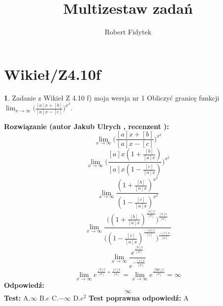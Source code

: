 \documentclass[12pt, a4paper]{article}
\title{Multizestaw zadań}
\author{Robert Fidytek}
\date{}
\theoremstyle{definition} %
\newtheorem{zad}{}
\newcommand{\kategoria}[1]{\section{#1}} %
\newcommand{\zadStart}[1]{\begin{zad}#1\newline} %
\newcommand{\zadStop}{\end{zad}}   %
\newcommand{\rozwStart}[2]{\noindent \textbf{Rozwiązanie (autor #1 , recenzent #2): }\newline} %
\newcommand{\rozwStop}{\newline}                                            %
\newcommand{\odpStart}{\noindent \textbf{Odpowiedź:}\newline}    %
\newcommand{\odpStop}{\newline}                                             %
\newcommand{\testStart}{\noindent \textbf{Test:}\newline} %
\newcommand{\testStop}{\newline} %
\newcommand{\kluczStart}{\noindent \textbf{Test poprawna odpowiedź:}\newline} %
\newcommand{\kluczStop}{\newline} %
\begin{document}
\maketitle


\kategoria{Wikieł/Z4.10f}
\zadStart{Zadanie z Wikieł Z 4.10 f) moja wersja nr 1}
Obliczyć granicę funkcji $\lim_{x \to \infty}\big(\frac{[a]x+[b]}{[a]x-[c]}\big)^{x^{2}}$.
\zadStop
\rozwStart{Jakub Ulrych}{}
$$\lim_{x \to \infty}\big(\frac{[a]x+[b]}{[a]x-[c]}\big)^{x^{2}}$$
$$\lim_{x \to \infty}\bigg(\frac{[a]x(1+\frac{[b]}{[a]x})}{[a]x(1-\frac{[c]}{[a]x})}\bigg)^{x^{2}}$$
$$\lim_{x \to \infty}\frac{(1+\frac{[b]}{[a]x})^{x^{2}}}{(1-\frac{[c]}{[a]x})^{x^{2}}}$$
$$\lim_{x \to \infty}\frac{\big((1+\frac{[b]}{[a]x})^{\frac{[a]x}{[b]}}\big)^{\frac{[b]x}{[a]}}}{\big((1-\frac{[c]}{[a]x})^{\frac{-[a]x}{[c]}}\big)^{\frac{-[c]x}{[a]}}}$$
$$\lim_{x \to \infty}\frac{e^{\frac{[b]x}{[a]}}}{e^{-\frac{[c]x}{[a]}}}$$
$$\lim_{x \to \infty}e^{\frac{[b]x}{[a]}+\frac{[c]x}{[a]}}=\lim_{x \to \infty}e^{\frac{[bpc]x}{[a]}}=\infty$$
\rozwStop
\odpStart
$$\infty$$
\odpStop
\testStart
A.$\infty$
B.$e$
C.$-\infty$
D.$e^{2}$
\testStop
\kluczStart
A
\kluczStop
\end{document}

